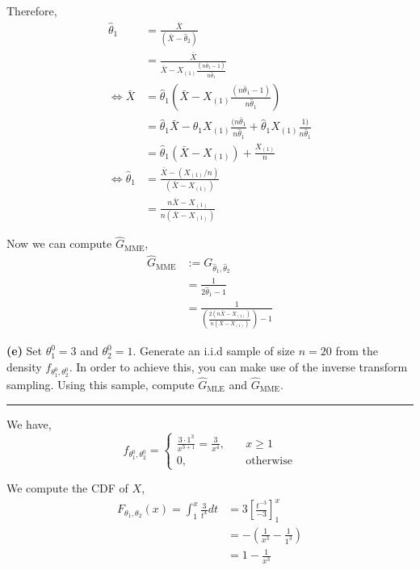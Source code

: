 \documentclass[10pt, a4paper, nofootinbib]{scrartcl}
\begin{document}
Therefore, 
\begin{align*}
  \hat{\theta}_1 
    &= \frac{\bar{X}}{(\bar{X} - \hat{\theta}_2)} \\
    &= \frac{\bar{X}}{\bar{X} - X_{(1)}\frac{(n\bar{\theta}_1 - 1)}{n\hat{\theta}_1}} \\
  \iff \bar{X} 
    &= \hat{\theta}_1 \left( \bar{X} - X_{(1)}\frac{(n\bar{\theta}_1 - 1)}{n\hat{\theta}_1} \right) \\
    &=\hat{\theta}_1 \bar{X} - \hat{\theta}_1 X_{(1)}\frac{(n\bar{\theta}_1}{n\hat{\theta}_1} + \hat{\theta}_1 X_{(1)}\frac{1)}{n\hat{\theta}_1} \\
    &= \hat{\theta}_1 \left( \bar{X} - X_{(1)} \right) + \frac{X_{(1)}}{n} \\
  \iff \hat{\theta}_1 
    &= \frac{\bar{X} - (X_{(1)}/n)}{(\bar{X} - X_{(1)})} \\
    &= \frac{n\bar{X} - X_{(1)}}{n(\bar{X} - X_{(1)})}
\end{align*}

Now we can compute $\hat{G}_{\text{MME}}$,
\begin{align*}
  \hat{G}_{\text{MME}}
    &:= G_{\hat{\theta}_1, \hat{\theta}_2} \\
    &= \frac{1}{2\hat{\theta}_1 - 1} \\
    &= \frac{1}{\left( \frac{2(n\bar{X} - X_{(1)})}{n(\bar{X} - X_{(1)})} \right) - 1}
\end{align*}

\textbf{(e)} Set $\theta_1^0 = 3$ and $\theta_2^0 = 1$. Generate an i.i.d sample of size $n = 20$ from the density $f_{\theta_1^0, \theta_2^0}$. In order to achieve this, you can make use of the inverse transform sampling. Using this sample, compute $\hat{G}_{\text{MLE}}$ and $\hat{G}_{\text{MME}}$.

\begin{center}\rule{6cm}{0.4pt}\end{center}

We have,
\begin{equation*}
  f_{\theta_1^0, \theta_2^0} = 
  \begin{cases}
    \frac{3 \cdot 1^{3}}{x^{3 + 1}} = \frac{3}{x^4}, &\quad x \geq 1 \\
    0,                                &\quad \text{otherwise}
  \end{cases}
\end{equation*}

We compute the CDF of $X$,
\begin{align*}
  F_{\theta_1, \theta_2}(x) = \int_{1}^{x} \frac{3}{t^4} dt 
    &= 3 \left[ \frac{t^{-3}}{-3} \right]_1^{x} \\
    &= - \left( \frac{1}{x^3} - \frac{1}{1^3} \right) \\
    &= 1 - \frac{1}{x^3}
\end{align*}
\end{document}
